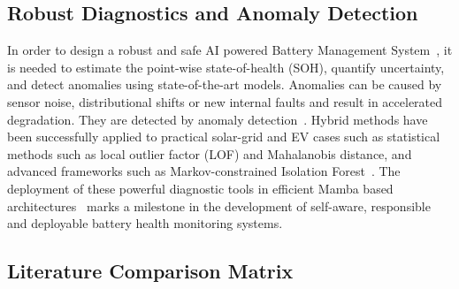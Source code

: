 \subsection{Robust Diagnostics and Anomaly Detection}
\label{subsec:related-anomaly}

In order to design a robust and safe AI powered Battery Management
System~\cite{arbaoui2024}, it is needed to estimate the point-wise
state-of-health (SOH), quantify uncertainty, and detect anomalies using
state-of-the-art models. Anomalies can be caused by sensor noise, distributional
shifts or new internal faults and result in accelerated degradation. They are
detected by anomaly detection~\cite{arbaoui2024}.
Hybrid methods have been successfully applied to practical solar-grid and EV
cases such as statistical methods such as local outlier factor (LOF) and
Mahalanobis distance, and advanced frameworks such as Markov-constrained
Isolation Forest~\cite{aljohani2026}. The deployment of these powerful
diagnostic tools in efficient Mamba based
architectures~\cite{meng2026,olalde2024} marks a milestone in the development of
self-aware, responsible and deployable battery health monitoring systems.

\subsection{Literature Comparison Matrix}
\label{subsec:related-matrix}

